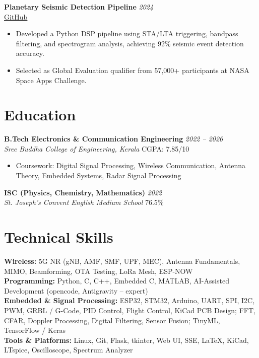 \documentclass[10pt,a4paper]{article}
\newcommand{\role}[2]{\textbf{#1} \hfill \textit{#2}}
\newcommand{\org}[2]{\textit{#1} \hfill #2}
\newcommand{\skillgroup}[2]{\textbf{#1:} #2}
\begin{document}
\role{Planetary Seismic Detection Pipeline}{2024} \\
\href{https://github.com/vass112/seismic-detection-ml}{GitHub}
\begin{itemize}
    \item Developed a Python DSP pipeline using STA/LTA triggering, bandpass filtering, and spectrogram analysis, achieving 92\% seismic event detection accuracy.
    \item Selected as Global Evaluation qualifier from 57,000+ participants at NASA Space Apps Challenge.
\end{itemize}

\section*{Education}

\role{B.Tech Electronics \& Communication Engineering}{2022 -- 2026} \\
\org{Sree Buddha College of Engineering, Kerala}{CGPA: 7.85/10}
\begin{itemize}
    \item Coursework: Digital Signal Processing, Wireless Communication, Antenna Theory, Embedded Systems, Radar Signal Processing
\end{itemize}

\role{ISC (Physics, Chemistry, Mathematics)}{2022} \\
\org{St. Joseph's Convent English Medium School}{76.5\%}

\section*{Technical Skills}

\skillgroup{Wireless}{5G NR (gNB, AMF, SMF, UPF, MEC), Antenna Fundamentals, MIMO, Beamforming, OTA Testing, LoRa Mesh, ESP-NOW} \\

\skillgroup{Programming}{Python, C, C++, Embedded C, MATLAB, AI-Assisted Development (opencode, Antigravity -- expert)} \\

\skillgroup{Embedded \& Signal Processing}{ESP32, STM32, Arduino, UART, SPI, I2C, PWM, GRBL / G-Code, PID Control, Flight Control, KiCad PCB Design; FFT, CFAR, Doppler Processing, Digital Filtering, Sensor Fusion; TinyML, TensorFlow / Keras} \\

\skillgroup{Tools \& Platforms}{Linux, Git, Flask, tkinter, Web UI, SSE, LaTeX, KiCad, LTspice, Oscilloscope, Spectrum Analyzer} \\
\end{document}
